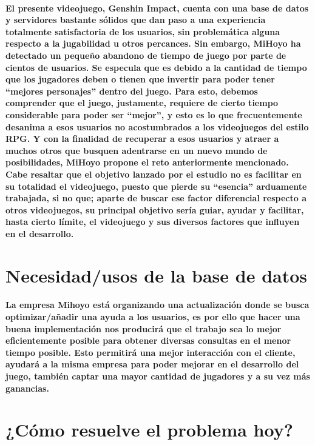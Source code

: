 \documentclass{report}
\begin{document}
\paragraph{El presente videojuego, Genshin Impact, cuenta con una base de datos y servidores bastante sólidos que dan paso a una experiencia totalmente satisfactoria de los usuarios, sin problemática alguna respecto a la jugabilidad u otros percances. Sin embargo, MiHoyo ha detectado un pequeño abandono de tiempo de juego por parte de cientos de usuarios. Se especula que es debido a la cantidad de tiempo que los jugadores deben o tienen que invertir para poder tener “mejores personajes” dentro del juego. Para esto, debemos comprender que el juego, justamente, requiere de cierto tiempo considerable para poder ser “mejor”, y esto es lo que frecuentemente desanima a esos usuarios no acostumbrados a los videojuegos del estilo RPG. Y con la finalidad de recuperar a esos usuarios y atraer a muchos otros que busquen adentrarse en un nuevo mundo de posibilidades, MiHoyo propone el reto anteriormente mencionado. Cabe resaltar que el objetivo lanzado por el estudio no es facilitar en su totalidad el videojuego, puesto que pierde su “esencia” arduamente trabajada, si no que; aparte de buscar ese factor diferencial respecto a otros videojuegos, su principal objetivo sería guiar, ayudar y facilitar, hasta cierto límite, el videojuego y sus diversos factores que influyen en el desarrollo.
}

\section{Necesidad/usos de la base de datos}
\paragraph{La empresa Mihoyo está organizando una actualización donde se busca optimizar/añadir una ayuda a los usuarios, es por ello que hacer una buena implementación nos producirá que el trabajo sea lo mejor eficientemente posible para obtener diversas consultas en el menor tiempo posible. Esto permitirá una mejor interacción con el cliente, ayudará a la misma empresa para poder mejorar en el desarrollo del juego, también captar una mayor cantidad de jugadores y a su vez más ganancias.}

\section{¿Cómo resuelve el problema hoy?}
\end{document}
